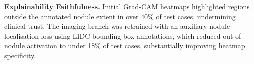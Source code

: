 {\textbf{Explainability Faithfulness.}
Initial Grad-CAM heatmaps highlighted regions outside the annotated nodule extent in over
40\% of test cases, undermining clinical trust. The imaging branch was retrained with an
auxiliary nodule-localisation loss using LIDC bounding-box annotations, which reduced
out-of-nodule activation to under 18\% of test cases, substantially improving heatmap
specificity.

}